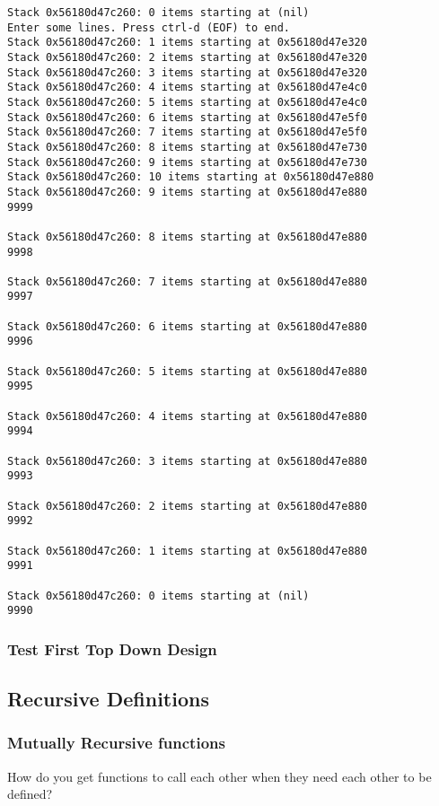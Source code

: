 \documentclass[11pt]{article}
\begin{document}
\begin{verbatim}
Stack 0x56180d47c260: 0 items starting at (nil)
Enter some lines. Press ctrl-d (EOF) to end.
Stack 0x56180d47c260: 1 items starting at 0x56180d47e320
Stack 0x56180d47c260: 2 items starting at 0x56180d47e320
Stack 0x56180d47c260: 3 items starting at 0x56180d47e320
Stack 0x56180d47c260: 4 items starting at 0x56180d47e4c0
Stack 0x56180d47c260: 5 items starting at 0x56180d47e4c0
Stack 0x56180d47c260: 6 items starting at 0x56180d47e5f0
Stack 0x56180d47c260: 7 items starting at 0x56180d47e5f0
Stack 0x56180d47c260: 8 items starting at 0x56180d47e730
Stack 0x56180d47c260: 9 items starting at 0x56180d47e730
Stack 0x56180d47c260: 10 items starting at 0x56180d47e880
Stack 0x56180d47c260: 9 items starting at 0x56180d47e880
9999

Stack 0x56180d47c260: 8 items starting at 0x56180d47e880
9998

Stack 0x56180d47c260: 7 items starting at 0x56180d47e880
9997

Stack 0x56180d47c260: 6 items starting at 0x56180d47e880
9996

Stack 0x56180d47c260: 5 items starting at 0x56180d47e880
9995

Stack 0x56180d47c260: 4 items starting at 0x56180d47e880
9994

Stack 0x56180d47c260: 3 items starting at 0x56180d47e880
9993

Stack 0x56180d47c260: 2 items starting at 0x56180d47e880
9992

Stack 0x56180d47c260: 1 items starting at 0x56180d47e880
9991

Stack 0x56180d47c260: 0 items starting at (nil)
9990

\end{verbatim}

\subsubsection{Test First Top Down Design}
\label{sec:orgf192eb3}

\subsection{Recursive Definitions}
\label{sec:orge0d011b}
\subsubsection{Mutually Recursive functions}
\label{sec:org9a22d89}

How do you get functions to call each other when they need each other
to be defined?
\end{document}

